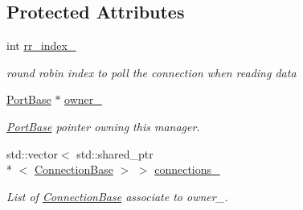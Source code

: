 \subsection*{Protected Attributes}
\begin{DoxyCompactItemize}
\item 
\hypertarget{classcoco_1_1_connection_manager_a96dd2c2e42aa9dd767746bb8e8771f2b}{int \hyperlink{classcoco_1_1_connection_manager_a96dd2c2e42aa9dd767746bb8e8771f2b}{rr\-\_\-index\-\_\-}}\label{classcoco_1_1_connection_manager_a96dd2c2e42aa9dd767746bb8e8771f2b}

\begin{DoxyCompactList}\small\item\em round robin index to poll the connection when reading data \end{DoxyCompactList}\item 
\hypertarget{classcoco_1_1_connection_manager_a620e2838da3375ebf9ecc6d0ef853e3d}{\hyperlink{classcoco_1_1_port_base}{Port\-Base} $\ast$ \hyperlink{classcoco_1_1_connection_manager_a620e2838da3375ebf9ecc6d0ef853e3d}{owner\-\_\-}}\label{classcoco_1_1_connection_manager_a620e2838da3375ebf9ecc6d0ef853e3d}

\begin{DoxyCompactList}\small\item\em \hyperlink{classcoco_1_1_port_base}{Port\-Base} pointer owning this manager. \end{DoxyCompactList}\item 
\hypertarget{classcoco_1_1_connection_manager_a1f34a36b21e6e124c3f954738f6717c4}{std\-::vector$<$ std\-::shared\-\_\-ptr\\*
$<$ \hyperlink{classcoco_1_1_connection_base}{Connection\-Base} $>$ $>$ \hyperlink{classcoco_1_1_connection_manager_a1f34a36b21e6e124c3f954738f6717c4}{connections\-\_\-}}\label{classcoco_1_1_connection_manager_a1f34a36b21e6e124c3f954738f6717c4}

\begin{DoxyCompactList}\small\item\em List of \hyperlink{classcoco_1_1_connection_base}{Connection\-Base} associate to {\ttfamily owner\-\_\-}. \end{DoxyCompactList}\end{DoxyCompactItemize}
